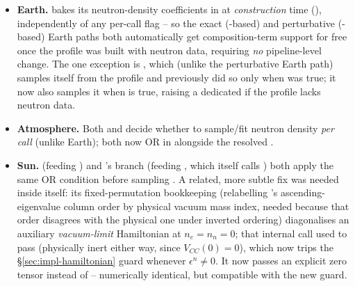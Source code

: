 \begin{implbox}
\begin{itemize}
  \item \textbf{Earth.}  bakes its neutron-density
    coefficients in at \emph{construction} time
    (),
    independently of any per-call flag -- so the exact
    (-based) and perturbative
    (-based) Earth paths both
    automatically get composition-term support for free once the profile was
    built with neutron data, requiring \emph{no} pipeline-level change. The
    one exception is , which
    (unlike the perturbative Earth path) samples  itself from the
    profile and previously did so only when  was
    true; it now also samples it when
     is true, raising a
    dedicated  if the profile lacks neutron data.
  \item \textbf{Atmosphere.} Both 
    and  decide whether to
    sample/fit neutron density \emph{per call} (unlike Earth); both now OR
    in  alongside the
    resolved .
  \item \textbf{Sun.}  (feeding
    ) and
    's 
    branch (feeding , which itself
    calls ) both apply the same OR condition
    before sampling . A related, more subtle fix was
    needed inside  itself: its
    fixed-permutation bookkeeping (relabelling 's
    ascending-eigenvalue column order by physical vacuum mass index, needed
    because that order disagrees with the physical one under inverted
    ordering) diagonalises an auxiliary \emph{vacuum-limit} Hamiltonian at
    $n_e=n_n=0$; that internal call used to pass 
    (physically inert either way, since $V_{CC}(0)=0$), which now trips the
    \S\ref{sec:impl-hamiltonian} guard whenever $\epsilon^n\neq0$. It now
    passes an explicit zero tensor instead of  -- numerically
    identical, but compatible with the new guard.
\end{itemize}
\end{implbox}

